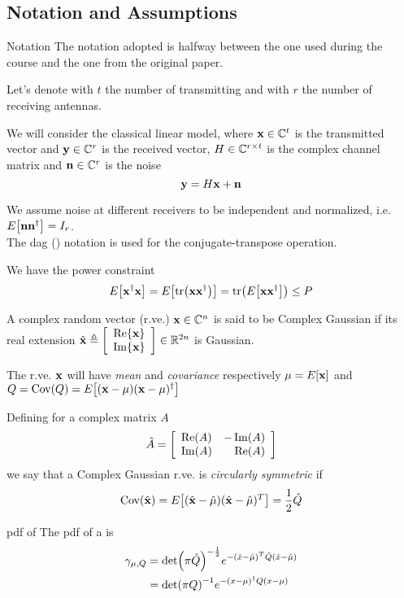 \subsection{Notation and Assumptions}
\begin{frame}[allowframebreaks]{Notation}
The notation adopted is halfway between the one used during the course and the one from the original paper.

\myspace
Let's denote with $t$ the number of transmitting and with $r$ the number of receiving antennas.

\myspace
We will consider the classical linear model, where $\vb{x}\in \mathbb{C}^{t}$ is the transmitted vector and $\vb{y}\in \mathbb{C}^{r}$ is the received vector, $H\in \mathbb{C}^{r\times t}$ is the complex channel matrix and $\vb{n}\in \mathbb{C}^{r}$ is the noise
$$\vb{y} = H\vb{x} + \vb{n}$$

\framebreak

We assume noise at different receivers to be independent and normalized, i.e. $E_{}\qty[\vb{n} \vb{n}^\dagger] = I_r$.\\
The dag (\dag) notation is used for the conjugate-transpose operation.

\myspace
We have the power constraint
$$E_{}\qty[\vb{x}^\dagger\vb{x}] = E_{}\qty[\tr(\vb{x}\vb{x}^\dagger)] = \tr(E_{}\qty[\vb{x}\vb{x}^\dagger])\leq P$$

\myspace
A complex random vector (r.ve.) $\vb{x}\in \mathbb{C}^{n}$ is said to be Complex Gaussian if its real extension $\hat{\vb{x}} \triangleq \qty[\begin{array}{c}
\Re{\vb{x}}\\
\Im{\vb{x}}
\end{array}]
\in \mathbb{R}^{2n}$ is Gaussian.

\myspace
The r.ve. $\vb{x}$ will have \textit{mean} and \textit{covariance} respectively $\mu= E_{}\qty[\vb{x}]$ and $Q = \text{Cov}\qty(Q) = E_{}\qty[(\vb{x}-\mu)(\vb{x}-\mu)^\dagger]$

\framebreak

Defining for a complex matrix $A$
$$\hat{A} = \qty[\begin{array}{lr}
\Re(A) & -\Im(A)\\
\Im(A) & \Re(A)
\end{array}]$$
we say that a Complex Gaussian r.ve. is \textit{circularly symmetric} if
$$\text{Cov}\qty(\hat{\vb{x}}) = E_{}\qty[(\hat{\vb{x}}-\hat{\mu})(\hat{\vb{x}}-\hat{\mu})^T] = \frac{1}{2} \hat{Q}$$

\begin{block}{pdf of \cscg}
	The pdf of a \cscg{} is
	\begin{align*}
	\begin{split}
	\gamma_{\mu,Q} &= \det(\pi\hat{Q})^{-\frac{1}{2}} e^{-(\hat{x}-\hat{\mu})^T\hat{Q}(\hat{x}-\hat{\mu})}\\
	&= \det(\pi Q)^{-1} e^{-(x-\mu)^\dagger Q(x-\mu)}
	\end{split}
	\end{align*}
\end{block}

\end{frame}


